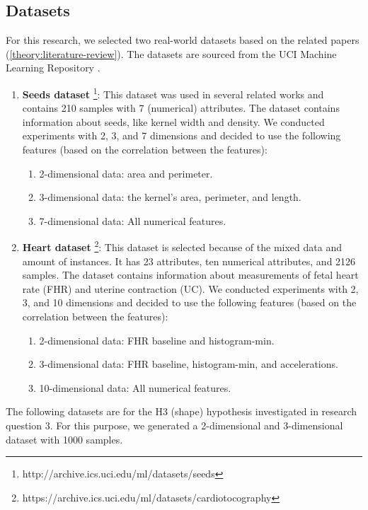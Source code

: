 \subsection{Datasets} \label{datasets-section}
For this research, we selected two real-world datasets based on the related papers (\ref{theory:literature-review}).
The datasets are sourced from the UCI Machine Learning Repository \citep{noauthor_uci_nodate}.
\begin{enumerate}
  \item \textbf{Seeds dataset} \footnote{http://archive.ics.uci.edu/ml/datasets/seeds}: This dataset was used in several related works and contains 210 samples with 7 (numerical) attributes.
        The dataset contains information about seeds, like kernel width and density.
        We conducted experiments with 2, 3, and 7 dimensions and decided to use the following features (based on the correlation between the features):
        \begin{enumerate}
          \item 2-dimensional data: area and perimeter.
          \item 3-dimensional data: the kernel's area, perimeter, and length.
          \item 7-dimensional data: All numerical features.
        \end{enumerate}
  \item \textbf{Heart dataset} \footnote{https://archive.ics.uci.edu/ml/datasets/cardiotocography}: This dataset is selected because of the mixed data and amount of instances.
        It has 23 attributes, ten numerical attributes, and 2126 samples.
        The dataset contains information about measurements of fetal heart rate (FHR) and uterine contraction (UC).
        We conducted experiments with 2, 3, and 10 dimensions and decided to use the following features (based on the correlation between the features):
        \begin{enumerate}
          \item 2-dimensional data: FHR baseline and histogram-min.
          \item 3-dimensional data: FHR baseline, histogram-min, and accelerations.
          \item 10-dimensional data: All numerical features.
        \end{enumerate}
\end{enumerate}
The following datasets are for the H3 (shape) hypothesis investigated in research question 3.
For this purpose, we generated a 2-dimensional and 3-dimensional dataset with 1000 samples.
